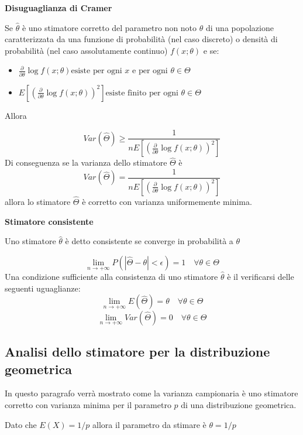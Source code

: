\documentclass[]{book}
\begin{document}
\textbf{Disuguaglianza di Cramer}

Se \(\hat{\theta}\) è uno stimatore corretto del parametro non noto
\(\theta\) di una popolazione caratterizzata da una funzione di
probabilità (nel caso discreto) o densità di probabilità (nel caso
assolutamente continuo) \(f(x;\theta)\) e se:

\begin{itemize}
\item
  \(\frac{\partial}{\partial \theta} \log f(x;\theta) \text{esiste per ogni } x \text{ e per ogni } \theta \in \Theta\)
\item
  \(E \left[ \left( \frac{\partial}{\partial \theta} \log f(x;\theta) \right)^2\right] \text{esiste finito per ogni } \theta \in \Theta\)
\end{itemize}

Allora

\[Var(\hat{\Theta}) \ge \frac{1}{n E \left[ \left( \frac{\partial}{\partial \theta} \log f(x;\theta) \right)^2\right]}\]
Di conseguenza se la varianza dello stimatore \(\hat\Theta\) è
\[Var(\hat{\Theta}) = \frac{1}{n E \left[ \left( \frac{\partial}{\partial \theta} \log f(x;\theta) \right)^2\right]}\]
allora lo stimatore \(\hat\Theta\) è corretto con varianza uniformemente
minima.

\textbf{Stimatore consistente}

Uno stimatore \(\hat{\theta}\) è detto consistente se converge in
probabilità a \(\theta\)

\[\lim_{n \to +\infty} P(|\hat{\Theta} - \theta| < \epsilon) = 1 \quad \forall \theta \in \Theta\]
Una condizione sufficiente alla consistenza di uno stimatore
\(\hat{\theta}\) è il verificarsi delle seguenti uguaglianze:
\[\lim_{n \to +\infty} E(\hat \Theta) = \theta \quad \forall \theta \in \Theta\]
\[\lim_{n \to +\infty} Var(\hat \Theta) = 0 \quad \forall \theta \in \Theta\]

\subsection{Analisi dello stimatore per la distribuzione
geometrica}\label{analisi-dello-stimatore-per-la-distribuzione-geometrica}

In questo paragrafo verrà mostrato come la varianza campionaria è uno
stimatore corretto con varianza minima per il parametro \(p\) di una
distribuzione geometrica.

Dato che \(E(X) = 1/p\) allora il parametro da stimare è
\(\theta = 1/p\)
\end{document}
